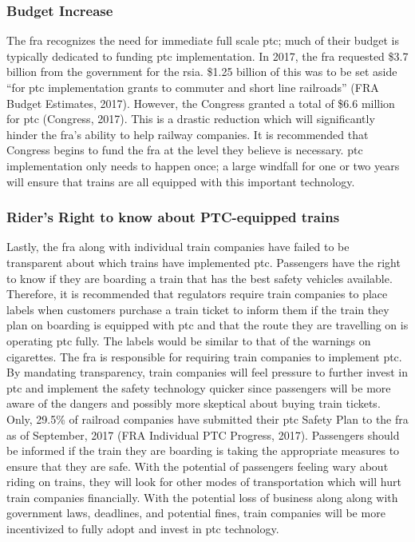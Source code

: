 \documentclass[11pt, titlepage]{article}
\begin{document}
\subsubsection{Budget Increase}

The \gls{fra} recognizes the need for immediate full scale \gls{ptc}; much of their
budget is typically dedicated to funding \gls{ptc} implementation. In 2017, the
\gls{fra} requested \$3.7 billion from the government for the \gls{rsia}.
\$1.25 billion of this was to be set aside ``for \gls{ptc} implementation grants to
commuter and short line railroads'' (FRA Budget Estimates, 2017).
However, the Congress granted a total of \$6.6 million for \gls{ptc}
(Congress, 2017). This is a drastic reduction which will
significantly hinder the \gls{fra}’s ability to help railway companies. It is
recommended that Congress begins to fund the \gls{fra} at the level they believe is
necessary. \gls{ptc} implementation only needs to happen once; a large windfall for
one or two years will ensure that trains are all equipped with this important
technology.

\subsubsection{Rider’s Right to know about PTC-equipped trains}

Lastly, the \gls{fra} along with individual train companies have failed to be
transparent about which trains have implemented \gls{ptc}. Passengers have the right
to know if they are boarding a train that has the best safety vehicles available.
Therefore, it is recommended that regulators require train companies to place
labels when customers purchase a train ticket to inform them if the train they plan
on boarding is equipped with \gls{ptc} and that the route they are travelling on is
operating \gls{ptc} fully. The labels would be similar to that of the warnings on
cigarettes. The \gls{fra} is responsible for requiring train companies to implement
\gls{ptc}. By mandating transparency, train companies will feel pressure to further
invest in \gls{ptc} and implement the safety technology quicker since passengers
will be more aware of the dangers and possibly more skeptical about buying train
tickets. Only, 29.5\% of railroad companies have submitted their \gls{ptc} Safety
Plan to the \gls{fra} as of September, 2017 (FRA Individual PTC Progress, 2017). Passengers
should be informed if the train they are boarding is taking the appropriate measures to ensure
that they are safe. With the potential of passengers feeling wary about riding on
trains, they will look for other modes of transportation which will hurt train
companies financially. With the potential loss of business along along with
government laws, deadlines, and potential fines, train companies will be more
incentivized to fully adopt and invest in \gls{ptc} technology.
\end{document}
